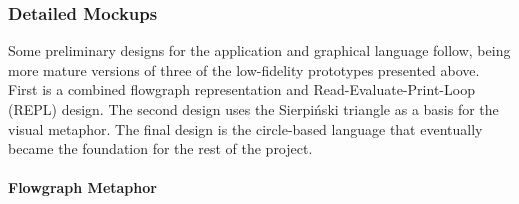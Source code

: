 \documentclass[12pt,twoside,notitlepage,xetex]{report}
\begin{document}

\subsubsection{Detailed Mockups}

Some preliminary designs for the application and graphical language follow,
being more mature versions of three of the low-fidelity prototypes presented
above.  First is a combined flowgraph representation and
Read-Evaluate-Print-Loop (REPL) design.  The second design uses the Sierpiński
triangle as a basis for the visual metaphor.  The final design is the
circle-based language that eventually became the foundation for the rest of the
project.

\paragraph{Flowgraph Metaphor}\hfill
\end{document}
